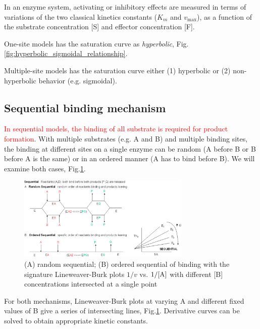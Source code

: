 In an enzyme system, activating or inhibitory effects are measured in terms of
variations of the two classical kinetics constants ($K_m$ and $v_\max$), as a
function of the substrate concentration [S] and effector concentration [F].


\begin{framed}
  One-site models has the saturation curve as {\it hyperbolic},
  Fig.\ref{fig:hyperbolic_sigmoidal_relationship}.
  
  Multiple-site models has the saturation curve either (1) hyperbolic or (2)
  non-hyperbolic behavior (e.g. sigmoidal).   
\end{framed}

\subsection{Sequential binding
mechanism}
\label{sec:sequential-models}

\textcolor{red}{In sequential models, the binding of all substrate is required
for product formation}. With multiple substrates (e.g. A and B) and multiple
binding sites, the binding at different sites on a single enzyme can be random
(A before B or B before A is the same) or in an ordered manner (A has to bind
before B). We will examine both cases, Fig.\ref{fig:binding-sequential}.

\begin{figure}[htb]
  \centerline{\includegraphics[height=4cm]{./images/binding_order2.eps}}
  \caption{(A) random sequential; (B) ordered
  sequential of binding with the signature
  Lineweaver-Burk plots $1/v$ vs. $1/\ce{[A]}$
  with different [B] concentrations intersected
  at a single point}\label{fig:binding-sequential}
\end{figure}

For both mechanisms, Lineweaver-Burk plots at varying A and different fixed
values of B give a series of intersecting lines,
Fig.\ref{fig:binding-sequential}.  Derivative curves can be solved to obtain
appropriate kinetic constants.

